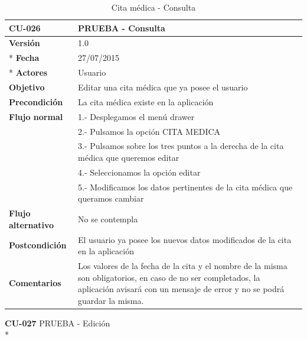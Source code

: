 \documentclass[../pfc.tex]{subfiles}
\begin{document}
		\begin{table}[H]
			\centering
			\begin{tabular}[t]{|p{3cm}|p{9.5cm}|}
				\hline \textbf{CU-026} & \textbf{PRUEBA - Consulta} \\*
				\hline\hline \textbf{Versión} & 1.0 \\ *
				\hline\hline \textbf{Fecha} & 27/07/2015 \\ *
				\hline\textbf{Actores} 	& Usuario\\*
				\hline \textbf{Objetivo} & Editar una cita médica que ya posee el usuario\\* 			
				\hline \textbf{Precondición} & La cita médica existe en la aplicación\\* 
				\hline \textbf{Flujo normal} & 1.- Desplegamos el menú drawer \\* 
				& 2.- Pulsamos la opción CITA MEDICA\\*	
				& 3.- Pulsamos sobre los tres puntos a la derecha de la cita médica que queremos editar\\*	
				& 4.- Seleccionamos la opción editar\\*	
				& 5.- Modificamos los datos pertinentes de la cita médica que queramos cambiar\\*	
				\hline \textbf{Flujo alternativo} & No se contempla \\* 
				\hline \textbf{Postcondición} & El usuario ya posee los nuevos datos modificados de la cita en la aplicación \\* 
				\hline \textbf{Comentarios}   & Los valores de la fecha de la cita y el nombre de la misma son obligatorios, en caso de no ser completados, la aplicación avisará con un mensaje de error y no se podrá guardar la misma.\\*
				\hline
			\end{tabular}
			\caption{Cita médica - Consulta}
			\label{tabla:caso026}
		\end{table}
		
		
		
		
		\textbf{CU-027}	PRUEBA - Edición\\*
		
\end{document}
